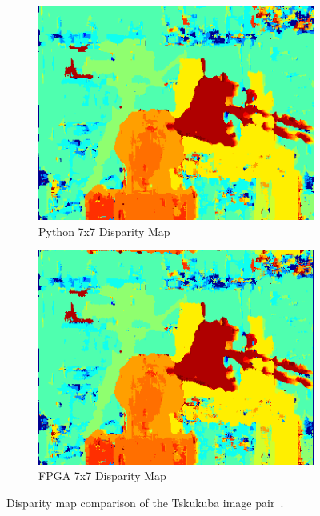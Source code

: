 \begin{figure}
\begin{center}
\begin{subfigure}{0.45\textwidth}
		\includegraphics[width=\textwidth]{figures/tsukuba_7x7_python3.png}
		\caption{Python 7x7 Disparity Map}
		\label{fig:tsukubaPy}
	\end{subfigure}
	\begin{subfigure}{0.45\textwidth}
		\includegraphics[width=\textwidth]{figures/tsukuba_7x7_fpga.png}
		\caption{FPGA 7x7 Disparity Map}
		\label{fig:tsukubaFPGA}
	\end{subfigure}
	\captionfonts
	\caption{Disparity map comparison of the Tskukuba image pair~\cite{middlebury}.}
	\label{fig:tsukubaDispMap}
\end{center}
\end{figure}

